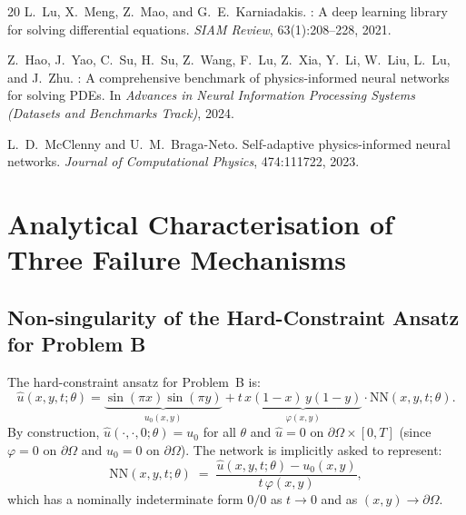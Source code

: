 \documentclass{article}
\begin{document}
\begin{thebibliography}{20}
L.~Lu, X.~Meng, Z.~Mao, and G.~E.~Karniadakis.
: A deep learning library for solving differential
  equations.
\newblock \emph{SIAM Review}, 63(1):208--228, 2021.

Z.~Hao, J.~Yao, C.~Su, H.~Su, Z.~Wang, F.~Lu, Z.~Xia, Y.~Li, W.~Liu,
  L.~Lu, and J.~Zhu.
: A comprehensive benchmark of physics-informed neural
  networks for solving {PDEs}.
\newblock In \emph{Advances in Neural Information Processing Systems (Datasets
  and Benchmarks Track)}, 2024.

L.~D.~McClenny and U.~M.~Braga-Neto.
\newblock Self-adaptive physics-informed neural networks.
\newblock \emph{Journal of Computational Physics}, 474:111722, 2023.

\end{thebibliography}

\appendix

\section{Analytical Characterisation of Three Failure Mechanisms}
\label{app:analytics}

\subsection{Non-singularity of the Hard-Constraint Ansatz for Problem B}
\label{app:hard_regularity}

The hard-constraint ansatz for Problem~B is:
\begin{equation}
  \hat{u}(x,y,t;\theta) = \underbrace{\sin(\pi x)\sin(\pi y)}_{u_0(x,y)}
  + t\,\underbrace{x(1-x)\,y(1-y)}_{\varphi(x,y)}\cdot\mathrm{NN}(x,y,t;\theta).
\label{eq:ansatz_B}
\end{equation}
By construction, $\hat{u}(\cdot,\cdot,0;\theta) = u_0$ for all $\theta$
and $\hat{u} = 0$ on $\partial\Omega\times[0,T]$ (since $\varphi = 0$ on
$\partial\Omega$ and $u_0 = 0$ on $\partial\Omega$).
The network is implicitly asked to represent:
\begin{equation}
  \mathrm{NN}(x,y,t;\theta)
  \;=\; \frac{\hat{u}(x,y,t;\theta) - u_0(x,y)}{t\,\varphi(x,y)},
\label{eq:nn_target}
\end{equation}
which has a nominally indeterminate form $0/0$ as $t\to0$ and as
$(x,y)\to\partial\Omega$.
\end{document}
